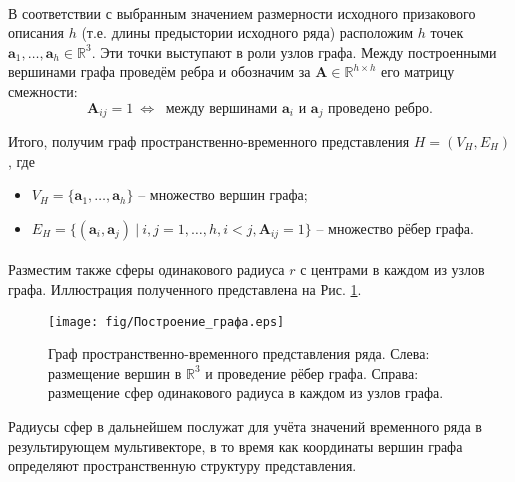 \documentclass[12pt]{article}
\begin{document}
\paragraph{}
В соответствии с выбранным значением размерности исходного призакового описания $h$ (т.е. длины предыстории исходного ряда) расположим $h$ точек $\mathbf{a}_1, \dots, \mathbf{a}_h \in \mathds{R}^3$. Эти точки выступают в роли узлов графа. Между построенными вершинами графа проведём ребра и обозначим за $\textbf{A} \in \mathds{R}^{h \times h}$ его матрицу смежности: \\
$$\textbf{A}_{ij} = 1 \ \Leftrightarrow \ \text{ между вершинами } \mathbf{a}_i \text{ и } \mathbf{a}_j \text{ проведено ребро.}$$

\noindent
Итого, получим граф пространственно-временного представления $H = (V_H, E_H)$, где
\begin{itemize}
    \item $V_H = \{\mathbf{a}_1, \dots, \mathbf{a}_h\}$ -- множество вершин графа;
    \item $E_H = \{(\mathbf{a}_i, \mathbf{a}_j) \ | \ i,j = 1, \dots, h, i < j, \textbf{A}_{ij} = 1 \}$ -- множество рёбер графа.
\end{itemize}
\paragraph{}
Разместим также сферы одинакового радиуса $r$ с центрами в каждом из узлов графа. Иллюстрация полученного представлена на Рис. \ref{fig:graph_construction}.

\begin{figure}[h]
    \centering
    \texttt{[image: fig/Построение\_графа.eps]}
    \caption{Граф пространственно-временного представления ряда. Слева: размещение вершин в $\mathds{R}^3$ и проведение рёбер графа. Справа: размещение сфер одинакового радиуса в каждом из узлов графа.}
    \label{fig:graph_construction}
\end{figure}

\noindent
Радиусы сфер в дальнейшем послужат для учёта значений временного ряда в результирующем мультивекторе, в то время как координаты вершин графа определяют пространственную структуру представления.
\end{document}
